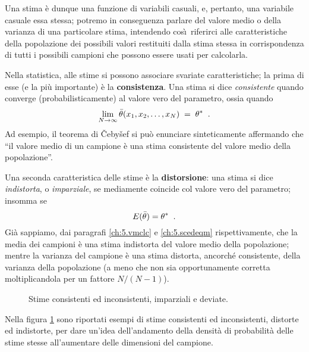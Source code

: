 Una stima \`e dunque una funzione di variabili casuali, e,
pertanto, una variabile casuale essa stessa; potremo in
conseguenza parlare del valore medio o della varianza di una
particolare stima, intendendo cos\`\i\ riferirci alle
caratteristiche della popolazione dei possibili valori
restituiti dalla stima stessa in corrispondenza di tutti i
possibili campioni che possono essere usati per calcolarla.

Nella statistica, alle stime si possono associare svariate
caratteristiche; la prima di esse (e la pi\`u importante)
\`e la \textbf{consistenza}.  Una stima si dice
\emph{consistente} quando converge (probabilisticamente) al
valore vero del parametro, ossia quando
\begin{equation*}
  \lim_{N\to\infty} \bar \theta(x_1,x_2,\ldots,x_N) \; = \;
    \theta^* \peq .
\end{equation*}
Ad esempio, il teorema di \v Ceby\v sef si pu\`o enunciare
sinteticamente affermando che ``il valore medio di un
campione \`e una stima consistente del valore medio della
popolazione''.

Una seconda caratteristica delle stime \`e la
\textbf{distorsione}: una stima si dice \emph{indistorta}, o
\emph{imparziale}, se mediamente coincide col valore vero
del parametro; insomma se
\begin{equation*}
  E ( \bar \theta ) = \theta^* \;\; .
\end{equation*}
Gi\`a sappiamo, dai paragrafi \ref{ch:5.vmclc} e
\ref{ch:5.scedeqm} rispettivamente, che la media dei
campioni \`e una stima indistorta del valore medio della
popolazione; mentre la varianza del campione \`e una stima
distorta, ancorch\'e consistente, della varianza della
popolazione (a meno che non sia opportunamente corretta
moltiplicandola per un fattore $N / (N-1)$).

\begin{figure}[htbp]
  \vspace*{2ex}
  \begin{center}
    
  \end{center}
  \caption[Stime consistenti ed inconsistenti, imparziali e
  deviate]{Stime consistenti ed inconsistenti, imparziali
    e deviate.}
  \label{fig:11.stime}
\end{figure}

Nella figura \ref{fig:11.stime} sono riportati esempi di
stime consistenti ed inconsistenti, distorte ed indistorte,
per dare un'idea dell'andamento della densit\`a di
probabilit\`a delle stime stesse all'aumentare delle
dimensioni del campione.


